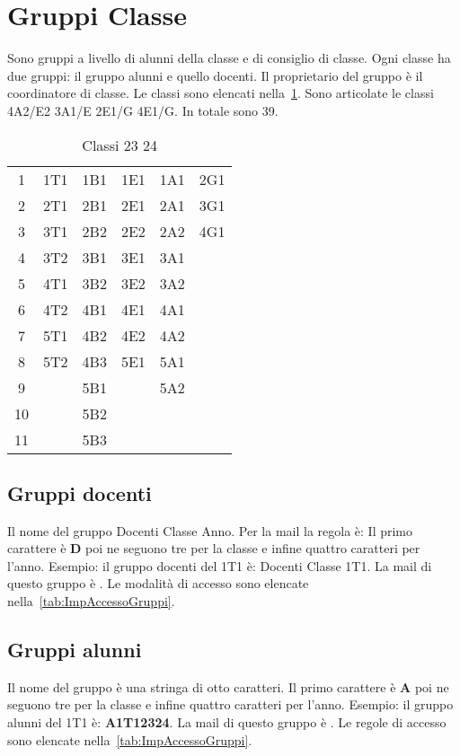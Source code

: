 \section{Gruppi Classe}
Sono gruppi a livello di alunni della classe e di consiglio di classe. Ogni classe ha due gruppi: il gruppo alunni e quello docenti. Il proprietario del gruppo è il coordinatore di classe. Le classi sono elencati nella~\cref{tab:classi2324}. Sono articolate le classi 4A2/E2 3A1/E 2E1/G 4E1/G. In totale sono 39.
\begin{table}
	\centering
	\begin{tabular}{cccccc}
\toprule
1&1T1	& 1B1 & 1E1 & 1A1 &2G1  \\
2&2T1	& 2B1 & 2E1 & 2A1 & 3G1 \\
3&3T1	&  2B2& 2E2 & 2A2 & 4G1 \\
4&3T2	&  3B1& 3E1 & 3A1 &  \\
5&4T1	&  3B2&  3E2& 3A2 &  \\
6&4T2	& 4B1 & 4E1 & 4A1 &  \\
7&5T1	& 4B2 & 4E2 & 4A2 &  \\
8&5T2	& 4B3 & 5E1 & 5A1 &  \\
9&	&  5B1&   & 5A2 & \\
10&	&  5B2&    &  \\
11&	&  5B3&         &  \\
\bottomrule
\end{tabular}
	\caption{Classi 23 24}
	\label{tab:classi2324}
\end{table}
\subsection{Gruppi docenti}
Il nome del gruppo  Docenti Classe Anno. Per la mail la regola è: Il primo  carattere è \textbf{D} poi ne seguono tre  per la classe e infine quattro caratteri per l'anno. 
Esempio: il gruppo docenti del 1T1 è: Docenti Classe 1T1. La mail di questo gruppo è . Le  modalità di accesso  sono elencate nella~\cref{tab:ImpAccessoGruppi}.
\subsection{Gruppi alunni}
Il nome del gruppo è una stringa di otto caratteri. Il primo  carattere è \textbf{A} poi ne seguono tre  per la classe e infine quattro caratteri per l'anno.
Esempio: il gruppo alunni del 1T1 è: \textbf{A1T12324}. La mail di questo gruppo è . Le  regole di accesso  sono elencate nella~\cref{tab:ImpAccessoGruppi}.
